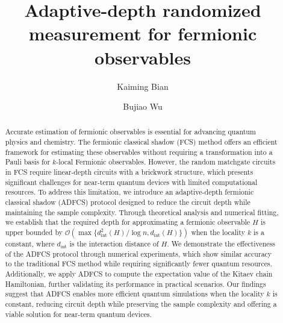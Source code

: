 \documentclass[showpacs,twocolumn,aps,prx,long bibliography,superscriptaddress,notitlepage]{revtex4-1}
\newcommand{\cbra}[1]{\{ #1 \}}
\newcommand{\Ord}[1]{\mathcal{O}\left( #1 \right)}
\begin{document}
\title{Adaptive-depth randomized measurement for fermionic observables}
\author{Kaiming Bian}
\author{Bujiao Wu}

\begin{abstract}
Accurate estimation of fermionic observables is essential for advancing quantum physics and chemistry. The fermionic classical shadow (FCS) method offers an efficient framework for estimating these observables without requiring a transformation into a Pauli basis for $k$-local Fermionic observables. However, the random matchgate circuits in FCS require linear-depth circuits with a brickwork structure, which presents significant challenges for near-term quantum devices with limited computational resources.
To address this limitation, we introduce an adaptive-depth fermionic classical shadow (ADFCS) protocol designed to reduce the circuit depth while maintaining the sample complexity. 
Through theoretical analysis and numerical fitting, we establish that the required depth for approximating a fermionic observable $H$ is upper bounded by $\Ord{\max\cbra{d^2_{\text{int}}(H)/\log n, d_{\text{int}}(H)}}$ when the locality $k$ is a constant, where $d_{\text{int}}$ is the interaction distance of $H$.
We demonstrate the effectiveness of the ADFCS protocol through numerical experiments, which show similar accuracy to the traditional FCS method while requiring significantly fewer quantum resources. Additionally, we apply ADFCS to compute the expectation value of the Kitaev chain Hamiltonian, further validating its performance in practical scenarios. 
Our findings suggest that ADFCS enables more efficient quantum simulations when the locality $k$ is constant, reducing circuit depth while preserving the sample complexity and offering a viable solution for near-term quantum devices.
\end{abstract}
\maketitle
\end{document}
